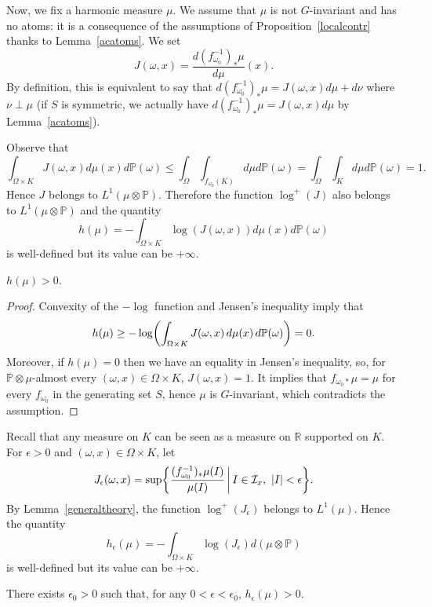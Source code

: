 \documentclass[AHL,Unicode,longabstracts,published]{cedram}
\newcommand{\bbP}{\mathbb{P}}
\newcommand{\R}{\mathbb{R}}
\newcommand{\clI}{\mathcal{I}}
\let\originalleft\left
\let\originalright\right
\renewcommand{\left}{\mathopen{}\mathclose\bgroup\originalleft}
\renewcommand{\right}{\aftergroup\egroup\originalright}
\newcommand{\R}{\mathbb{R}}
\begin{document}
Now, we fix a harmonic measure $\mu$. We assume that $\mu$ is not $G$-invariant and has no atoms: it is a consequence of the assumptions of Proposition~\ref{localcontr} thanks to Lemma~\ref{acatoms}. We set
\[
J(\omega,x)= \frac{d (f_{\omega_{0}}^{-1})_{*} \mu}{d\mu}(x).
\]
By definition, this is equivalent to say that $d(f_{\omega_{0}}^{-1})_{*}\mu=J(\omega,x) d\mu+d\nu$ where $\nu\perp\mu$ (if $S$ is symmetric, we actually have $d(f_{\omega_{0}}^{-1})_{*}\mu=J(\omega,x) d\mu$ by Lemma~\ref{acatoms}).


Observe that
\[
\int_{\Omega \times K} J(\omega,x) d\mu(x) d \bbP(\omega)\leq \int_{\Omega} \int_{f_{\omega_{0}}(K)} d \mu d\bbP(\omega) =\int_{\Omega} \int_{K} d \mu d\bbP(\omega)=1.
\]
Hence $J$ belongs to $L^{1}(\mu \otimes \bbP)$. Therefore the function $\log^{+}(J)$ also belongs to $L^{1}(\mu \otimes \bbP)$ and the quantity
\[
h(\mu)= - \int_{\Omega \times K} \log(J(\omega,x)) d\mu(x) d\bbP(\omega)
\]
is well-defined but its value can be $+\infty$.

\begin{lemm}\label{positiveentropy}
$h(\mu)>0.$
\end{lemm}

\begin{proof}
Convexity of the $-\log$ function and Jensen's inequality imply that
\[
h(\mu) \geq - \log\left(\int_{\Omega \times K} J(\omega,x)\, d\mu(x)\,
d \bbP(\omega)\right)=0.
\]
Moreover, if $h(\mu)=0$ then we have an equality in Jensen's inequality, so, for $\bbP \otimes \mu$-almost every $(\omega,x) \in \Omega \times K$, $J(\omega,x)=1$. It implies that $f_{\omega_0 *}\mu=\mu$ for every $f_{\omega_0}$ in the generating set $S$, hence $\mu$ is $G$-invariant, which contradicts the assumption.
\end{proof}

Recall that any measure on $K$ can be seen as a measure on $\R$ supported on $K$. For $\epsilon >0$ and $(\omega,x) \in \Omega \times K$, let
\[
J_{\epsilon}(\omega,x)= \sup \left\{ \frac{(f_{\omega_0}^{-1})_{*}\mu(I)}{\mu(I)} \, \middle| \, I \in \clI_{x}, \ |I| < \epsilon \right\}.
\]
By Lemma~\ref{generaltheory}, the function $\log^{+}(J_{\epsilon})$ belongs to $L^{1}(\mu)$. Hence the quantity
\[
h_{\epsilon}(\mu)= - \int_{\Omega \times K} \log(J_{\epsilon}) d(\mu \otimes \bbP)
\]
is well-defined but its value can be $+\infty$.

\begin{lemm}\label{approxentr}
There exists $\epsilon_{0} >0$ such that, for any $0 <\epsilon< \epsilon_{0}$, $h_{\epsilon}(\mu) >0$.
\end{lemm}
\end{document}
